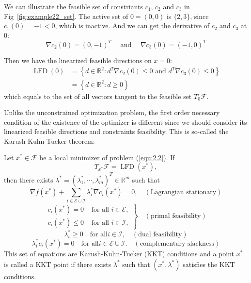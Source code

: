\par We can illustrate the feasible set of constriants $c_1$, $c_2$ and $c_3$ in Fig~\ref{fig:example22_set}. The active set of $0=(0,0)$ is $\{2, 3\}$, since $c_1(0) = -1 < 0$, which is inactive. And we can get the derivative of $c_2$ and $c_3$ at 0: 
$$
\nabla c_{2}(0)=(0,-1)^{T} \quad \textrm { and } \quad \nabla c_{3}(0)=(-1,0)^{T}
$$
\par Then we have the linearized feasible directions on $x=0$: 
$$
\begin{aligned} \operatorname{LFD}(0) &=\left\{d \in \mathbb{R}^{2}: d^{T} \nabla c_{2}(0) \leq 0 \text { and } d^{T} \nabla c_{3}(0) \leq 0\right\} \\ &=\left\{d \in \mathbb{R}^{2}: d \geq 0\right\} \end{aligned}
$$
which equals to the set of all vectors tangent to the feasible set $T_{0} \mathscr{F}$. 
\par Unlike the unconstrained optimization problem, the first order necessary condition of the existence of the optimizer is different since we should consider its linearized feasible directions and constraints feasibility. This is so-called the Karush-Kuhn-Tucker theorem: 
\begin{thm}
    Let $x^* \in \mathscr{F}$ be a local minimizer of problem (\ref{equ:2.2}). If
    $$
    T_{x^*} \mathscr{F} = \operatorname{LFD}(x^*),
    $$
    then there exists $\lambda^{*}=\left(\lambda_{1}^{*}, \cdots, \lambda_{m}^{*}\right)^{T} \in \mathbb{R}^{m}$ such that 
    $$
    \nabla f\left(x^{*}\right)+\sum_{i \in \mathscr{E} \cup \mathscr{I}} \lambda_{i}^{*} \nabla c_{i}\left(x^{*}\right)=0, \quad(\textrm {Lagrangian stationary})
    $$
    $$
    \left.\begin{array}{ll}c_{i}\left(x^{*}\right)=0 & \text { for all } i \in \mathscr{E}, \\ c_{i}\left(x^{*}\right) \leq 0 & \text { for all } i \in \mathscr{I},\end{array}\right\} \quad(\textrm {primal feasibility})
    $$
    $$
    \lambda_{i}^{*} \geq 0 \quad \textrm {for all} i \in \mathscr{I}, \quad (\textrm {dual feasibility})
    $$
    $$
    \lambda_i^*c_i(x^*) = 0 \quad \textrm {for all} i \in \mathscr{E} \cup \mathscr{I}. \quad (\textrm {complementary slackness})
    $$
    This set of equations are Karush-Kuhn-Tucker (KKT) conditions and a point $x^*$ is called a KKT point if there exists $\lambda^*$ such that $(x^*, \lambda ^*)$ satisfies the KKT conditions.
\end{thm}
